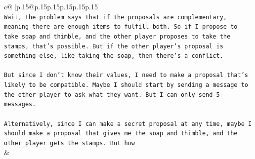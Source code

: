 \documentclass{article}
\begin{document}
{\begin{supertabular}{c@{$\;$}|p{.15\linewidth}@{}p{.15\linewidth}p{.15\linewidth}p{.15\linewidth}p{.15\linewidth}p{.15\linewidth}}
{{{\\ 
\texttt{Wait, the problem says that if the proposals are complementary, meaning there are enough items to fulfill both. So if I propose to take soap and thimble, and the other player proposes to take the stamps, that's possible. But if the other player's proposal is something else, like taking the soap, then there's a conflict. } \\
\\ 
\texttt{But since I don't know their values, I need to make a proposal that's likely to be compatible. Maybe I should start by sending a message to the other player to ask what they want. But I can only send 5 messages. } \\
\\ 
\texttt{Alternatively, since I can make a secret proposal at any time, maybe I should make a proposal that gives me the soap and thimble, and the other player gets the stamps. But how} \\
            }
        }
    }
    & \\ \\


\end{supertabular}}
\end{document}
